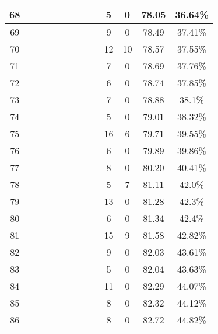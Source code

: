 \begin{longtable}{|c|c|c|c|c|c|c|c|c|c|c|c|c|}
68 &  \x    & \x    & \x    & \x    & \x\m  &       & \x    &       & 5 & 0 & 78.05 & 36.64\% \\ \hline
69 &  \x    & \x    & \x    & \x    &       & \x\m  &       & \x    & 9 & 0 & 78.49 & 37.41\% \\ \hline
70 &  \x    & \x    &       & \x    & \x\m  & \x\m  &       & \x\m  & 12 & 10 & 78.57 & 37.55\% \\ \hline
71 &  \x    & \x    & \x    & \x    & \x    &       &       & \x    & 7 & 0 & 78.69 & 37.76\% \\ \hline
72 &  \x    & \x    & \x    &       & \x    & \x\m  &       & \x\m  & 6 & 0 & 78.74 & 37.85\% \\ \hline
73 &  \x    & \x    & \x    &       & \x    & \x\m  &       &       & 7 & 0 & 78.88 & 38.1\% \\ \hline
74 &  \x    & \x    &       & \x    & \x    & \x    &       &       & 5 & 0 & 79.01 & 38.32\% \\ \hline
75 &  \x    & \x    &       &       & \x\m  & \x\m  & \x\m  &       & 16 & 6 & 79.71 & 39.55\% \\ \hline
76 &  \x    & \x    & \x    & \x    &       &       & \x    &       & 6 & 0 & 79.89 & 39.86\% \\ \hline
77 &  \x    & \x    & \x    &       &       & \x\m  &       & \x\m  & 8 & 0 & 80.20 & 40.41\% \\ \hline
78 &  \x    & \x    & \x    & \x    & \x    & \x\m  &       & \x    & 5 & 7 & 81.11 & 42.0\% \\ \hline
79 &  \x    & \x    &       &       &       &       &       &       & 13 & 0 & 81.28 & 42.3\% \\ \hline
80 &  \x    & \x    & \x    & \x    &       & \x    &       & \x    & 6 & 0 & 81.34 & 42.4\% \\ \hline
81 &  \x    & \x    &       &       & \x\m  & \x\m  &       & \x\m  & 15 & 9 & 81.58 & 42.82\% \\ \hline
82 &  \x    & \x    & \x    & \x    &       &       &       & \x\m  & 9 & 0 & 82.03 & 43.61\% \\ \hline
83 &  \x    & \x    & \x    &       & \x    & \x\m  & \x    &       & 5 & 0 & 82.04 & 43.63\% \\ \hline
84 &  \x    & \x    &       & \x    & \x    &       &       &       & 11 & 0 & 82.29 & 44.07\% \\ \hline
85 &  \x    & \x    & \x    &       &       & \x\m  &       &       & 8 & 0 & 82.32 & 44.12\% \\ \hline
86 &  \x    & \x    &       & \x    &       &       &       &       & 8 & 0 & 82.72 & 44.82\% \\ \hline

\end{longtable}
